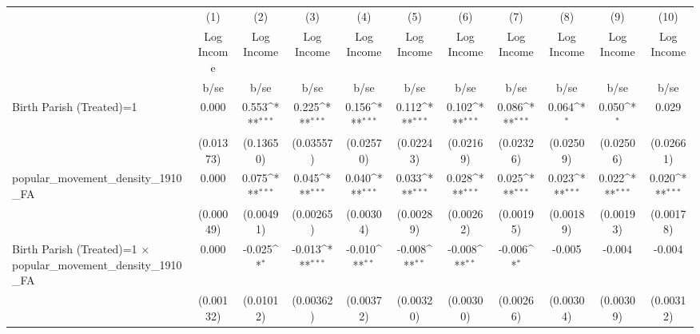 {
\def\sym#1{\ifmmode^{#1}\else\(^{#1}\)\fi}
\begin{tabular}{l*{10}{c}}
\hline\hline
                    &\multicolumn{1}{c}{(1)}&\multicolumn{1}{c}{(2)}&\multicolumn{1}{c}{(3)}&\multicolumn{1}{c}{(4)}&\multicolumn{1}{c}{(5)}&\multicolumn{1}{c}{(6)}&\multicolumn{1}{c}{(7)}&\multicolumn{1}{c}{(8)}&\multicolumn{1}{c}{(9)}&\multicolumn{1}{c}{(10)}\\
                    &\multicolumn{1}{c}{Log Income}&\multicolumn{1}{c}{Log Income}&\multicolumn{1}{c}{Log Income}&\multicolumn{1}{c}{Log Income}&\multicolumn{1}{c}{Log Income}&\multicolumn{1}{c}{Log Income}&\multicolumn{1}{c}{Log Income}&\multicolumn{1}{c}{Log Income}&\multicolumn{1}{c}{Log Income}&\multicolumn{1}{c}{Log Income}\\
                    &        b/se         &        b/se         &        b/se         &        b/se         &        b/se         &        b/se         &        b/se         &        b/se         &        b/se         &        b/se         \\
\hline
Birth Parish (Treated)=1&       0.000         &       0.553\sym{***}&       0.225\sym{***}&       0.156\sym{***}&       0.112\sym{***}&       0.102\sym{***}&       0.086\sym{***}&       0.064\sym{*}  &       0.050\sym{*}  &       0.029         \\
                    &   (0.01373)         &   (0.13650)         &   (0.03557)         &   (0.02570)         &   (0.02243)         &   (0.02169)         &   (0.02326)         &   (0.02509)         &   (0.02506)         &   (0.02661)         \\
popular\_movement\_density\_1910\_FA&       0.000         &       0.075\sym{***}&       0.045\sym{***}&       0.040\sym{***}&       0.033\sym{***}&       0.028\sym{***}&       0.025\sym{***}&       0.023\sym{***}&       0.022\sym{***}&       0.020\sym{***}\\
                    &   (0.00049)         &   (0.00491)         &   (0.00265)         &   (0.00304)         &   (0.00289)         &   (0.00262)         &   (0.00195)         &   (0.00189)         &   (0.00193)         &   (0.00178)         \\
Birth Parish (Treated)=1 $\times$ popular\_movement\_density\_1910\_FA&       0.000         &      -0.025\sym{*}  &      -0.013\sym{***}&      -0.010\sym{**} &      -0.008\sym{**} &      -0.008\sym{**} &      -0.006\sym{*}  &      -0.005         &      -0.004         &      -0.004         \\
                    &   (0.00132)         &   (0.01012)         &   (0.00362)         &   (0.00372)         &   (0.00320)         &   (0.00300)         &   (0.00266)         &   (0.00304)         &   (0.00309)         &   (0.00312)         \\

\end{tabular}}
